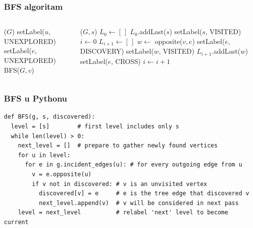 \documentclass[compress]{beamer}
\begin{document}
\begin{frame}[fragile,shrink=2]
  \frametitle{BFS algoritam}
  {\footnotesize
  \begin{columns}
    \begin{column}[t]{6cm}
      \begin{algorithmic}
        \STATE {}($G$)
          \STATE setLabel($u$, {\scriptsize UNEXPLORED})
        \ENDFOR
          \STATE setLabel($e$, {\scriptsize UNEXPLORED})
        \ENDFOR
            \STATE BFS($G,v$)
          \ENDIF
        \ENDFOR
      \end{algorithmic}
    \end{column}
    \begin{column}[t]{6cm}
      \begin{algorithmic}
        \STATE {}($G,s$)
        \STATE $L_{0} \leftarrow [\,]$
        \STATE $L_{0}$.addLast($s$)
        \STATE setLabel($s$, {\scriptsize VISITED})
        \STATE $i \leftarrow 0$
          \STATE $L_{i+1} \leftarrow [\,]$
                \STATE $w \leftarrow$ opposite($v,e$)
                  \STATE setLabel($e$, {\scriptsize DISCOVERY})
                  \STATE setLabel($w$, {\scriptsize VISITED})
                  \STATE $L_{i+1}$.addLast($w$)
                \ELSE
                  \STATE setLabel($e$, {\scriptsize CROSS})
                \ENDIF
              \ENDIF
            \ENDFOR
          \ENDFOR
          $i \leftarrow i + 1$
        \ENDWHILE
      \end{algorithmic}
    \end{column}
  \end{columns}
  }
\end{frame}

\begin{frame}[fragile,shrink=20]
  \frametitle{BFS u Pythonu}
\begin{verbatim}
def BFS(g, s, discovered):
  level = [s]        # first level includes only s
  while len(level) > 0:
    next_level = []  # prepare to gather newly found vertices
    for u in level:
      for e in g.incident_edges(u): # for every outgoing edge from u
        v = e.opposite(u)
        if v not in discovered: # v is an unvisited vertex
          discovered[v] = e     # e is the tree edge that discovered v
          next_level.append(v)  # v will be considered in next pass
    level = next_level          # relabel 'next' level to become current
\end{verbatim}
\end{frame}
\end{document}
